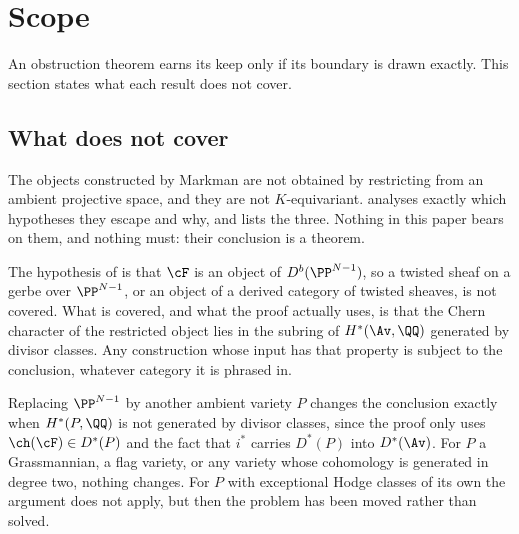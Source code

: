 \section{Scope}\label{sec:scope}

An obstruction theorem earns its keep only if its boundary is drawn exactly.
This section states what each result does not cover.

\subsection{What \texorpdfstring{}{the divisor obstruction} does not cover}

\begin{remark}\label{rem:markmanscope}
The objects constructed by Markman \cite{Mar25a,Mar25b} are not obtained by
restricting from an ambient projective space, and they are not
$K$-equivariant.  analyses exactly which hypotheses they
escape and why, and  lists the three. Nothing in this
paper bears on them, and nothing must: their conclusion is a theorem.
\end{remark}

\begin{remark}\label{rem:twisted}
The hypothesis of  is that $\cF$ is an object of
$D^{b}(\PP^{N-1})$, so a twisted sheaf on a gerbe over $\PP^{N-1}$, or an
object of a derived category of twisted sheaves, is not covered. What is
covered, and what the proof actually uses, is that the Chern character of the
restricted object lies in the subring of $H^{*}(\Av,\QQ)$ generated by
divisor classes. Any construction whose input has that property is subject to
the conclusion, whatever category it is phrased in.
\end{remark}

\begin{remark}\label{rem:otherambient}
Replacing $\PP^{N-1}$ by another ambient variety $P$ changes the conclusion
exactly when $H^{*}(P,\QQ)$ is not generated by divisor classes, since the
proof only uses $\ch(\cF)\in D^{*}(P)$ and the fact that $i^{*}$ carries
$D^{*}(P)$ into $D^{*}(\Av)$. For $P$ a Grassmannian, a flag variety, or any
variety whose cohomology is generated in degree two, nothing changes. For $P$
with exceptional Hodge classes of its own the argument does not apply, but
then the problem has been moved rather than solved.
\end{remark}

